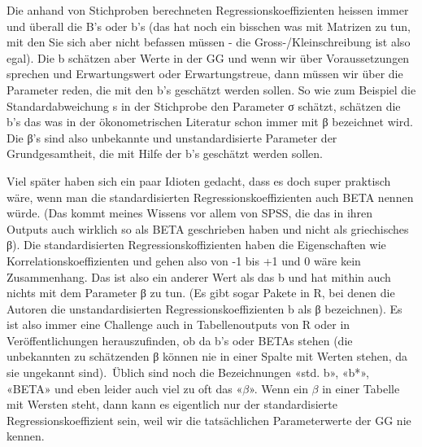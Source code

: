 \documentclass[
  10pt,
  letterpaper,
  a4paper, twoside]{scrreprt}
\begin{document}
\begin{tcolorbox}[enhanced jigsaw, coltitle=black, opacitybacktitle=0.6, toptitle=1mm, colbacktitle=quarto-callout-important-color!10!white, colback=white, toprule=.15mm, opacityback=0, bottomrule=.15mm, arc=.35mm, colframe=quarto-callout-important-color-frame, leftrule=.75mm, titlerule=0mm, breakable, left=2mm, rightrule=.15mm, title={Q\&A: Was ist der Unterschied zwischen ``b'', ``\(\beta\)''``,''std.
b'', ``b*'' und ``BETA''? In Statistik Einführung wurde der
standardisierte Regressionskoeffizient mit \(\beta\) (ungut bis falsch)
bezeichnet.}, bottomtitle=1mm]

Die anhand von Stichproben berechneten Regressionskoeffizienten heissen
immer und überall die B's oder b's (das hat noch ein bisschen was mit
Matrizen zu tun, mit den Sie sich aber nicht befassen müssen - die
Gross-/Kleinschreibung ist also egal). Die b schätzen aber Werte in der
GG und wenn wir über Voraussetzungen sprechen und Erwartungswert oder
Erwartungstreue, dann müssen wir über die Parameter reden, die mit den
b's geschätzt werden sollen. So wie zum Beispiel die Standardabweichung
s in der Stichprobe den Parameter σ schätzt, schätzen die b's das was in
der ökonometrischen Literatur schon immer mit β bezeichnet wird. Die β's
sind also unbekannte und unstandardisierte Parameter der
Grundgesamtheit, die mit Hilfe der b's geschätzt werden sollen.~

Viel später haben sich ein paar Idioten gedacht, dass es doch super
praktisch wäre, wenn man die standardisierten Regressionskoeffizienten
auch BETA nennen würde. (Das kommt meines Wissens vor allem von SPSS,
die das in ihren Outputs auch wirklich so als BETA geschrieben haben und
nicht als griechisches β). Die standardisierten Regressionskoffizienten
haben die Eigenschaften wie Korrelationskoeffizienten und gehen also von
-1 bis +1 und 0 wäre kein Zusammenhang. Das ist also ein anderer Wert
als das b und hat mithin auch nichts mit dem Parameter β zu tun. (Es
gibt sogar Pakete in R, bei denen die Autoren die unstandardisierten
Regressionskoeffizienten b als β bezeichnen). Es ist also immer eine
Challenge auch in Tabellenoutputs von R oder in Veröffentlichungen
herauszufinden, ob da b's oder BETAs stehen (die unbekannten zu
schätzenden β können nie in einer Spalte mit Werten stehen, da sie
ungekannt sind).~Üblich sind noch die Bezeichnungen «std. b», «b*»,
«BETA» und eben leider auch viel zu oft das «\(\beta\)». Wenn ein
\(\beta\) in einer Tabelle mit Wersten steht, dann kann es eigentlich
nur der standardisierte Regressionskoeffizient sein, weil wir die
tatsächlichen Parameterwerte der GG nie kennen.


\end{tcolorbox}
\end{document}
